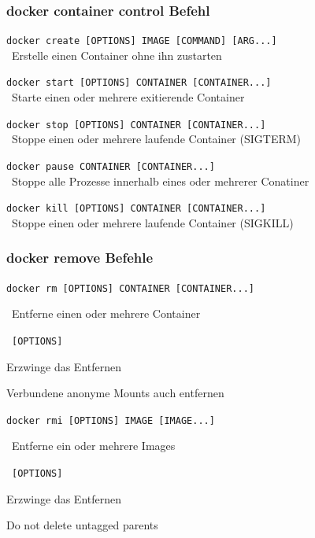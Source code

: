 \documentclass[22pt]{beamer}
\newcommand{\code}[1]{\colorbox{gray!15}{\texttt{#1}}}
\newcommand{\desclabel}[1]{\textcolor{cyan}{#1}}
\begin{document}
\begin{frame}
    \frametitle{docker container control Befehl}

    \code{docker create [OPTIONS] IMAGE [COMMAND] [ARG...]}\\
    \-  \ Erstelle einen Container ohne ihn zustarten \medskip

    \code{docker start [OPTIONS] CONTAINER [CONTAINER...]}\\
    \-  \ Starte einen oder mehrere exitierende Container \medskip

    \code{docker stop [OPTIONS] CONTAINER [CONTAINER...]}\\
    \-  \ Stoppe einen oder mehrere laufende Container (SIGTERM) \medskip

    \code{docker pause CONTAINER [CONTAINER...]}\\
    \-  \ Stoppe alle Prozesse innerhalb eines oder mehrerer Conatiner \medskip

    \code{docker kill [OPTIONS] CONTAINER [CONTAINER...]}\\
    \-  \ Stoppe einen oder mehrere laufende Container (SIGKILL) \medskip
    
\end{frame}

\begin{frame}
    \frametitle{docker remove Befehle}
    \code{docker rm [OPTIONS] CONTAINER [CONTAINER...]}

    \- \ Entferne einen oder mehrere Container\vspace{5pt}

    \-  \ \code{[OPTIONS]}
    \begin{description}[labelindent=0.5cm, style=unboxed, labelwidth=\widthof{-v, -\,-volumess}, leftmargin=!]
        \item[\desclabel{-f, -\,-force}] Erzwinge das Entfernen
        \item[\desclabel{-v, -\,-volumes}] Verbundene anonyme Mounts auch entfernen
    \end{description}\medskip\medskip
    \code{docker rmi [OPTIONS] IMAGE [IMAGE...]}

    \- \ Entferne ein oder mehrere Images\vspace{5pt}

    \-  \ \code{[OPTIONS]}
    \begin{description}[labelindent=0.5cm, style=unboxed, labelwidth=\widthof{-\,-no-prunes}, leftmargin=!]
        \item[\desclabel{-f, -\,-force}] Erzwinge das Entfernen
        \item[\desclabel{-\,-no-prune}] Do not delete untagged parents
    \end{description}
\end{frame}
\end{document}
